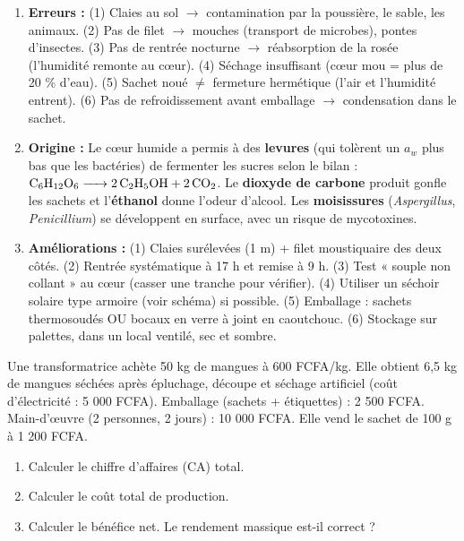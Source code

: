 \documentclass[11pt]{article}
\begin{document}
\begin{corrige}
\begin{enumerate}
    \item \textbf{Erreurs :} (1) Claies au sol $\rightarrow$ contamination par la poussière, le sable, les animaux. (2) Pas de filet $\rightarrow$ mouches (transport de microbes), pontes d'insectes. (3) Pas de rentrée nocturne $\rightarrow$ réabsorption de la rosée (l'humidité remonte au cœur). (4) Séchage insuffisant (cœur mou = plus de 20 \% d'eau). (5) Sachet noué $\neq$ fermeture hermétique (l'air et l'humidité entrent). (6) Pas de refroidissement avant emballage $\rightarrow$ condensation dans le sachet.
    \item \textbf{Origine :} Le cœur humide a permis à des \textbf{levures} (qui tolèrent un $a_w$ plus bas que les bactéries) de fermenter les sucres selon le bilan : $\ce{C6H12O6 -> 2 C2H5OH + 2 CO2}$. Le \textbf{dioxyde de carbone} produit gonfle les sachets et l'\textbf{éthanol} donne l'odeur d'alcool. Les \textbf{moisissures} (\emph{Aspergillus}, \emph{Penicillium}) se développent en surface, avec un risque de mycotoxines.
    \item \textbf{Améliorations :} (1) Claies surélevées (1 m) + filet moustiquaire des deux côtés. (2) Rentrée systématique à 17 h et remise à 9 h. (3) Test « souple non collant » au cœur (casser une tranche pour vérifier). (4) Utiliser un séchoir solaire type armoire (voir schéma) si possible. (5) Emballage : sachets thermosoudés OU bocaux en verre à joint en caoutchouc. (6) Stockage sur palettes, dans un local ventilé, sec et sombre.
\end{enumerate}
\end{corrige}

\begin{exercice}
Une transformatrice achète 50 kg de mangues à 600 FCFA/kg. Elle obtient 6,5 kg de mangues séchées après épluchage, découpe et séchage artificiel (coût d'électricité : 5 000 FCFA). Emballage (sachets + étiquettes) : 2 500 FCFA. Main-d'œuvre (2 personnes, 2 jours) : 10 000 FCFA. Elle vend le sachet de 100 g à 1 200 FCFA.
\begin{enumerate}
    \item Calculer le chiffre d'affaires (CA) total.
    \item Calculer le coût total de production.
    \item Calculer le bénéfice net. Le rendement massique est-il correct ?
\end{enumerate}
\end{exercice}
\end{document}
